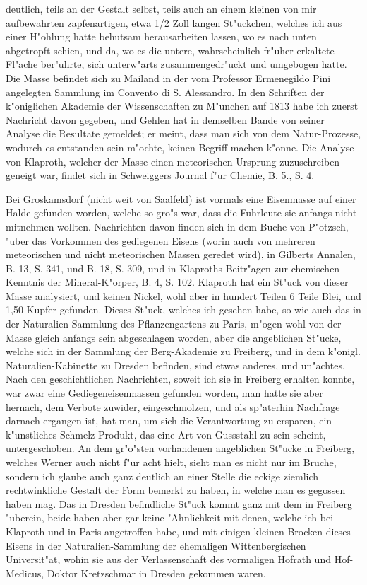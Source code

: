 \documentclass[a4paper, 11pt, oneside, polutonikogreek, german]{article}
\begin{document}
deutlich, teils an der Gestalt selbst, teils auch an einem kleinen von mir aufbewahrten zapfenartigen, etwa 1/2 Zoll langen St"uckchen, welches ich aus einer H"ohlung hatte behutsam herausarbeiten lassen, wo es nach unten abgetropft schien, und da, wo es die untere, wahrscheinlich fr"uher erkaltete Fl"ache ber"uhrte, sich unterw"arts zusammengedr"uckt und umgebogen hatte. Die Masse befindet sich zu Mailand in der vom Professor Ermenegildo Pini angelegten Sammlung im Convento di S. Alessandro. In den Schriften der k"oniglichen Akademie der Wissenschaften zu M"unchen auf 1813 habe ich zuerst Nachricht davon gegeben, und Gehlen hat in demselben Bande von seiner Analyse die Resultate gemeldet; er meint, dass man sich von dem Natur-Prozesse, wodurch es entstanden sein m"ochte, keinen Begriff machen k"onne. Die Analyse von Klaproth, welcher der Masse einen meteorischen Ursprung zuzuschreiben geneigt war, findet sich in Schweiggers Journal f"ur Chemie, B. 5., S. 4.

Bei Groskamsdorf (nicht weit von Saalfeld) ist vormals eine Eisenmasse auf einer Halde gefunden worden, welche so gro"s war, dass die Fuhrleute sie anfangs nicht mitnehmen wollten. Nachrichten davon finden sich in dem Buche von P"otzsch, "uber das Vorkommen des gediegenen Eisens (worin auch von mehreren meteorischen und nicht meteorischen Massen geredet wird), in Gilberts Annalen, B. 13, S. 341, und B. 18, S. 309, und in Klaproths Beitr"agen zur chemischen Kenntnis der Mineral-K"orper, B. 4, S. 102. Klaproth hat ein St"uck von dieser Masse analysiert, und keinen Nickel, wohl aber in hundert Teilen 6 Teile Blei, und 1,50 Kupfer gefunden. Dieses St"uck, welches ich gesehen habe, so wie auch das in der Naturalien-Sammlung des Pflanzengartens zu Paris, m"ogen wohl von der Masse gleich anfangs sein abgeschlagen worden, aber die angeblichen St"ucke, welche sich in der Sammlung der Berg-Akademie zu Freiberg, und in dem k"onigl. Naturalien-Kabinette zu Dresden befinden, sind etwas anderes, und un"achtes. Nach den geschichtlichen Nachrichten, soweit ich sie in Freiberg erhalten konnte, war zwar eine Gediegeneisenmassen gefunden worden, man hatte sie aber hernach, dem Verbote zuwider, eingeschmolzen, und als sp"aterhin Nachfrage darnach ergangen ist, hat man, um sich die Verantwortung zu ersparen, ein k"unstliches Schmelz-Produkt, das eine Art von Gussstahl zu sein scheint, untergeschoben. An dem gr"o"sten vorhandenen angeblichen St"ucke in Freiberg, welches Werner auch nicht f"ur acht hielt, sieht man es nicht nur im Bruche, sondern ich glaube auch ganz deutlich an einer Stelle die eckige ziemlich rechtwinkliche Gestalt der Form bemerkt zu haben, in welche man es gegossen haben mag. Das in Dresden befindliche St"uck kommt ganz mit dem in Freiberg "uberein, beide haben aber gar keine "Ahnlichkeit mit denen, welche ich bei Klaproth und in Paris angetroffen habe, und mit einigen kleinen Brocken dieses Eisens in der Naturalien-Sammlung der ehemaligen Wittenbergischen Universit"at, wohin sie aus der Verlassenschaft des vormaligen Hofrath und Hof-Medicus, Doktor Kretzschmar in Dresden gekommen waren.
\end{document}
